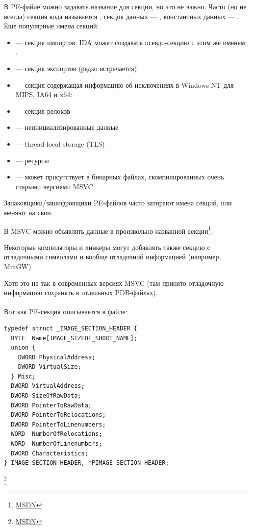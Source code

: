 В PE-файле можно задавать название для секции, но это не важно.
Часто (но не всегда) секция кода называется , секция данных --- , константных данных ---  .
Еще популярные имена секций: 

\begin{itemize}
\item {} --- секция импортов. \ac{IDA} может создавать псевдо-секцию с этим же именем: .
\item {} --- секция экспортов (редко встречается)
\item {} --- секция содержащая информацию об исключениях в Windows NT для MIPS, \ac{IA64} и x64: 
\item {} --- секция релоков
\item {} --- неинициализированные данные
\item {} --- thread local storage (\ac{TLS})
\item {} --- ресурсы
\item {} --- может присутствует в бинарных файлах, скомпилированных очень старыми версиями MSVC
\end{itemize}

Запаковщики/зашифровщики PE-файлов часто затирают имена секций, или меняют на свои.

В \ac{MSVC} можно объявлять данные в произвольно названной секции\footnote{\href{http://go.yurichev.com/17047}{MSDN}}.

Некоторые компиляторы и линкеры могут добавлять также секцию с отладочными символами 
и вообще отладочной информацией (например, MinGW).

Хотя это не так в современных версиях \ac{MSVC} (там принято отладочную информацию сохранять в отдельных \gls{PDB}-файлах).\\
\\
Вот как PE-секция описывается в файле:

\begin{lstlisting}
typedef struct _IMAGE_SECTION_HEADER {
  BYTE  Name[IMAGE_SIZEOF_SHORT_NAME];
  union {
    DWORD PhysicalAddress;
    DWORD VirtualSize;
  } Misc;
  DWORD VirtualAddress;
  DWORD SizeOfRawData;
  DWORD PointerToRawData;
  DWORD PointerToRelocations;
  DWORD PointerToLinenumbers;
  WORD  NumberOfRelocations;
  WORD  NumberOfLinenumbers;
  DWORD Characteristics;
} IMAGE_SECTION_HEADER, *PIMAGE_SECTION_HEADER;
\end{lstlisting}
\footnote{\href{http://go.yurichev.com/17048}{MSDN}}

